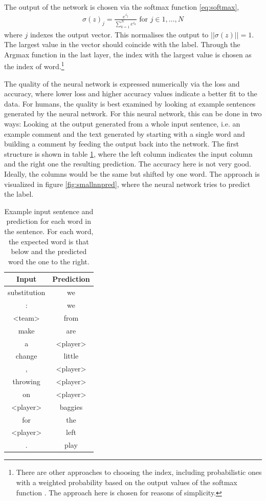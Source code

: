 \documentclass[10pt, a4paper]{UUThesisTemplate}
\begin{document}
The output of the network is chosen via the softmax function \eqref{eq:softmax},
\begin{align*}
\sigma(z)_j = \frac{e^{z_j}}{\sum_{k=1}^N e^{z_k}} \text{ for } j \in 1,\ldots,N
\end{align*}
where $j$ indexes the output vector. This normalises the output to $||\sigma(z)||=1$. The largest value in the vector should coincide with the label. Through the Argmax function in the last layer, the index with the largest value is chosen as the index of word.\footnote{There are other approaches to choosing the index, including probabilistic ones with a weighted probability based on the output values of the softmax function \cite{otherapproaches}. The approach here is chosen for reasons of simplicity.}

The quality of the neural network is expressed numerically via the loss and accuracy, where lower loss and higher accuracy values indicate a better fit to the data. For humans, the quality is best examined by looking at example sentences generated by the neural network. For this neural network, this can be done in two ways: Looking at the output generated from a whole input sentence, i.e. an example comment and the text generated by starting with a single word and building a comment by feeding the output back into the network. The first structure is shown in table \ref{tab:smallnnpred}, where the left column indicates the input column and the right one the resulting prediction. The accuracy here is not very good. Ideally, the columns would be the same but shifted by one word. The approach is visualized in figure \ref{fig:smallnnpred}, where the neural network tries to predict the label.

\begin{table}
\scriptsize
\begin{tabular}{c c}
Input & Prediction\\\hline
substitution & we\\
: & we\\
<team> & from\\
make & are\\
a & <player>\\
change & little\\
, & <player>\\
throwing & <player>\\
on & <player>\\
<player> & baggies\\
for & the\\
<player> & left\\
. & play\\\hline
\end{tabular}
\caption{Example input sentence and prediction for each word in the sentence. For each word, the expected word is that below and the predicted word the one to the right.}\label{tab:smallnnpred}\vspace{-18pt}
\end{table}
\end{document}
